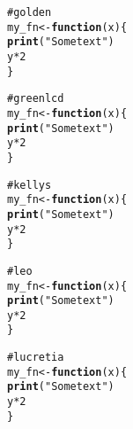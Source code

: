 \documentclass[12pt]{article}\usepackage{graphicx, color}
\makeatletter
\newcommand{\hlfunctioncall}[1]{\textcolor[rgb]{0.188235294117647,0.650980392156863,0.188235294117647}{\textbf{#1}}}%
\newcommand{\hlstring}[1]{\textcolor[rgb]{0.850980392156863,1,0.466666666666667}{#1}}%
\newcommand{\hlcomment}[1]{\textcolor[rgb]{0.533333333333333,0.533333333333333,0.533333333333333}{#1}}%
\newenvironment{kframe}{%
 \def\at@end@of@kframe{}%
 \ifinner\ifhmode%
  \def\at@end@of@kframe{\end{minipage}}%
  \begin{minipage}{\columnwidth}%
 \fi\fi%
 \def\FrameCommand##1{\hskip\@totalleftmargin \hskip-\fboxsep
 \colorbox{shadecolor}{##1}\hskip-\fboxsep
     \hskip-\linewidth \hskip-\@totalleftmargin \hskip\columnwidth}%
 \MakeFramed {\advance\hsize-\width
   \@totalleftmargin\z@ \linewidth\hsize
   \@setminipage}}%
 {\par\unskip\endMakeFramed%
 \at@end@of@kframe}
\newenvironment{knitrout}{}{} %
\makeatother
\begin{document}
\begin{knitrout}
\color{fgcolor}\begin{kframe}
\begin{alltt}
\hlcomment{# golden}
my_fn <- \hlfunctioncall{function}(x) \{
    \hlfunctioncall{print}(\hlstring{"Some text"})
    y * 2
\}
\end{alltt}
\end{kframe}
\end{knitrout}





\begin{knitrout}
\color{fgcolor}\begin{kframe}
\begin{alltt}
\hlcomment{# greenlcd}
my_fn <- \hlfunctioncall{function}(x) \{
    \hlfunctioncall{print}(\hlstring{"Some text"})
    y * 2
\}
\end{alltt}
\end{kframe}
\end{knitrout}





\begin{knitrout}
\color{fgcolor}\begin{kframe}
\begin{alltt}
\hlcomment{# kellys}
my_fn <- \hlfunctioncall{function}(x) \{
    \hlfunctioncall{print}(\hlstring{"Some text"})
    y * 2
\}
\end{alltt}
\end{kframe}
\end{knitrout}





\begin{knitrout}
\color{fgcolor}\begin{kframe}
\begin{alltt}
\hlcomment{# leo}
my_fn <- \hlfunctioncall{function}(x) \{
    \hlfunctioncall{print}(\hlstring{"Some text"})
    y * 2
\}
\end{alltt}
\end{kframe}
\end{knitrout}





\begin{knitrout}
\color{fgcolor}\begin{kframe}
\begin{alltt}
\hlcomment{# lucretia}
my_fn <- \hlfunctioncall{function}(x) \{
    \hlfunctioncall{print}(\hlstring{"Some text"})
    y * 2
\}
\end{alltt}
\end{kframe}
\end{knitrout}
\end{document}
